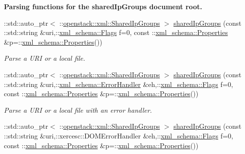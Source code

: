 \begin{Indent}{\bf Parsing functions for the sharedIpGroups document root.}\par
\begin{DoxyCompactItemize}
\item 
::std::auto\_\-ptr$<$ ::\hyperlink{classopenstack_1_1xml_1_1SharedIpGroups}{openstack::xml::SharedIpGroups} $>$ \hyperlink{namespaceopenstack_1_1xml_af4c615587bd812eb8b1099ceeb303a64}{sharedIpGroups} (const ::std::string \&uri,::\hyperlink{namespacexml__schema_affb4c227cbd9aa7453dd1dc5a1401943}{xml\_\-schema::Flags} f=0, const ::\hyperlink{namespacexml__schema_ad27ce19a7ee1d3b1064092648898f64c}{xml\_\-schema::Properties} \&p=::\hyperlink{namespacexml__schema_ad27ce19a7ee1d3b1064092648898f64c}{xml\_\-schema::Properties}())
\begin{DoxyCompactList}\small\item\em Parse a URI or a local file. \item\end{DoxyCompactList}\item 
::std::auto\_\-ptr$<$ ::\hyperlink{classopenstack_1_1xml_1_1SharedIpGroups}{openstack::xml::SharedIpGroups} $>$ \hyperlink{namespaceopenstack_1_1xml_a9f5129810c4c79c557a17f9394dcbe31}{sharedIpGroups} (const ::std::string \&uri,::\hyperlink{namespacexml__schema_ab1c9361bfd3b404eaabf0c31eded79dc}{xml\_\-schema::ErrorHandler} \&eh,::\hyperlink{namespacexml__schema_affb4c227cbd9aa7453dd1dc5a1401943}{xml\_\-schema::Flags} f=0, const ::\hyperlink{namespacexml__schema_ad27ce19a7ee1d3b1064092648898f64c}{xml\_\-schema::Properties} \&p=::\hyperlink{namespacexml__schema_ad27ce19a7ee1d3b1064092648898f64c}{xml\_\-schema::Properties}())
\begin{DoxyCompactList}\small\item\em Parse a URI or a local file with an error handler. \item\end{DoxyCompactList}\item 
::std::auto\_\-ptr$<$ ::\hyperlink{classopenstack_1_1xml_1_1SharedIpGroups}{openstack::xml::SharedIpGroups} $>$ \hyperlink{namespaceopenstack_1_1xml_a36ef3ac9b06dba9b6edbeb50f52cf749}{sharedIpGroups} (const ::std::string \&uri,::xercesc::DOMErrorHandler \&eh,::\hyperlink{namespacexml__schema_affb4c227cbd9aa7453dd1dc5a1401943}{xml\_\-schema::Flags} f=0, const ::\hyperlink{namespacexml__schema_ad27ce19a7ee1d3b1064092648898f64c}{xml\_\-schema::Properties} \&p=::\hyperlink{namespacexml__schema_ad27ce19a7ee1d3b1064092648898f64c}{xml\_\-schema::Properties}())

\end{DoxyCompactItemize}
\end{Indent}
